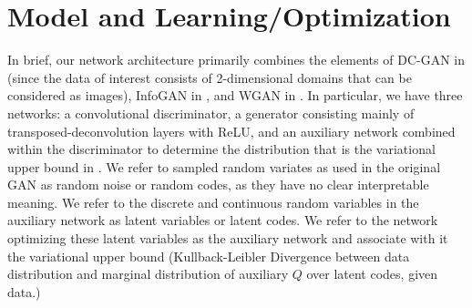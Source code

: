 \documentclass{article}
\begin{document}
\section{Model and Learning/Optimization}\label{opt}
	In brief, our network architecture primarily combines the elements of DC-GAN in \cite{Radford2015UnsupervisedNetworks} (since the data of interest consists of 2-dimensional domains that can be considered as images), InfoGAN in \cite{InfoGAN}, and WGAN in \cite{Arjovsky2017WassersteinGAN}. In particular, we have three networks: a convolutional discriminator, a generator consisting mainly of transposed-deconvolution layers with ReLU, and an auxiliary network combined within the discriminator to determine the distribution that is the variational upper bound in \cite{InfoGAN}.  We refer to sampled random variates as used in the original GAN as random noise or random codes, as they have no clear interpretable meaning.  We refer to the discrete and continuous random variables in the auxiliary network as latent variables or latent codes.  We refer to the network optimizing these latent variables as the auxiliary network and associate with it the variational upper bound (Kullback-Leibler Divergence between data distribution and marginal distribution of auxiliary $Q$ over latent codes, given data.) 
\end{document}
